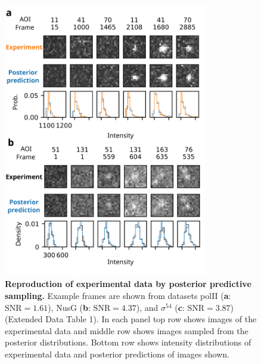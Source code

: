 \begin{figure}[t]
\centering
\includegraphics[width=89mm]{figures/figure4/figure4.png}
\caption{\textbf{Reproduction of experimental data by posterior predictive sampling.} Example frames are shown from datasets polII (\textbf{a}: $\mathrm{SNR}=1.61$), NusG (\textbf{b}: $\mathrm{SNR}=4.37$), and $\sigma^{54}$ (\textbf{c}: $\mathrm{SNR}=3.87$) (Extended Data Table 1). In each panel top row shows images of the experimental data and middle row shows images sampled from the posterior distributions. Bottom row shows intensity distributions of experimental data and posterior predictions of images shown. }
\label{fig:posterior_samples}
\end{figure}

